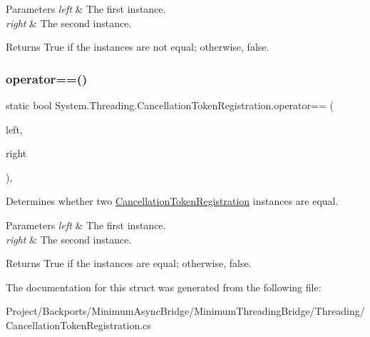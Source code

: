 \begin{DoxyParams}{Parameters}
{\em left} & The first instance.\\
\hline
{\em right} & The second instance.\\
\hline
\end{DoxyParams}
\begin{DoxyReturn}{Returns}
True if the instances are not equal; otherwise, false.
\end{DoxyReturn}
\mbox{\label{struct_system_1_1_threading_1_1_cancellation_token_registration_ae0b6b71e049bef0ebcceeecbed95e3d8}} 
\subsubsection{\texorpdfstring{operator==()}{operator==()}}
{\footnotesize\ttfamily static bool System.\+Threading.\+Cancellation\+Token\+Registration.\+operator== (\begin{DoxyParamCaption}\item[{\hyperlink{struct_system_1_1_threading_1_1_cancellation_token_registration}{Cancellation\+Token\+Registration}}]{left,  }\item[{\hyperlink{struct_system_1_1_threading_1_1_cancellation_token_registration}{Cancellation\+Token\+Registration}}]{right }\end{DoxyParamCaption})\hspace{0.3cm}{\ttfamily [inline]}, {\ttfamily [static]}}



Determines whether two \hyperlink{}{Cancellation\+Token\+Registration} instances are equal. 


\begin{DoxyParams}{Parameters}
{\em left} & The first instance.\\
\hline
{\em right} & The second instance.\\
\hline
\end{DoxyParams}
\begin{DoxyReturn}{Returns}
True if the instances are equal; otherwise, false.
\end{DoxyReturn}


The documentation for this struct was generated from the following file\+:\begin{DoxyCompactItemize}
\item 
Project/\+Backports/\+Minimum\+Async\+Bridge/\+Minimum\+Threading\+Bridge/\+Threading/Cancellation\+Token\+Registration.\+cs\end{DoxyCompactItemize}
